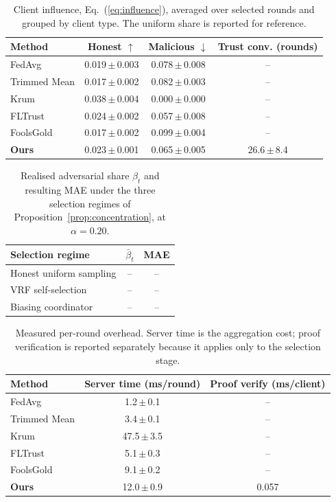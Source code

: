 \begin{table}[t]
\centering
\scriptsize
\caption{Client influence, Eq.~(\ref{eq:influence}), averaged over selected rounds and grouped by client type. The uniform share is reported for reference.}
\label{tab:trust_influence}
\setlength{\tabcolsep}{6pt}
\begin{tabular}{lccc}
\toprule
\textbf{Method} & \textbf{Honest $\uparrow$} & \textbf{Malicious $\downarrow$} & \textbf{Trust conv. (rounds)} \\
\midrule
FedAvg & 0.019\,$\pm$\,0.003 & 0.078\,$\pm$\,0.008 & -- \\
Trimmed Mean & 0.017\,$\pm$\,0.002 & 0.082\,$\pm$\,0.003 & -- \\
Krum & 0.038\,$\pm$\,0.004 & 0.000\,$\pm$\,0.000 & -- \\
FLTrust & 0.024\,$\pm$\,0.002 & 0.057\,$\pm$\,0.008 & -- \\
FoolsGold & 0.017\,$\pm$\,0.002 & 0.099\,$\pm$\,0.004 & -- \\
\textbf{Ours} & 0.023\,$\pm$\,0.001 & 0.065\,$\pm$\,0.005 & 26.6\,$\pm$\,8.4 \\
\bottomrule
\end{tabular}
\end{table}

\begin{table}[t]
\centering
\scriptsize
\caption{Realised adversarial share $\beta_t$ and resulting MAE under the three selection regimes of Proposition~\ref{prop:concentration}, at $\alpha=0.20$.}
\label{tab:selection}
\begin{tabular}{lcc}
\toprule
\textbf{Selection regime} & $\bar{\beta}_t$ & \textbf{MAE} \\
\midrule
Honest uniform sampling & -- & -- \\
VRF self-selection & -- & -- \\
Biasing coordinator & -- & -- \\
\bottomrule
\end{tabular}
\end{table}

\begin{table}[t]
\centering
\scriptsize
\caption{Measured per-round overhead. Server time is the aggregation cost; proof verification is reported separately because it applies only to the selection stage.}
\label{tab:overhead}
\setlength{\tabcolsep}{4pt}
\begin{tabular}{lcc}
\toprule
\textbf{Method} & \textbf{Server time (ms/round)} & \textbf{Proof verify (ms/client)} \\
\midrule
FedAvg & 1.2\,$\pm$\,0.1 & -- \\
Trimmed Mean & 3.4\,$\pm$\,0.1 & -- \\
Krum & 47.5\,$\pm$\,3.5 & -- \\
FLTrust & 5.1\,$\pm$\,0.3 & -- \\
FoolsGold & 9.1\,$\pm$\,0.2 & -- \\
\textbf{Ours} & 12.0\,$\pm$\,0.9 & 0.057 \\
\bottomrule
\end{tabular}
\end{table}

